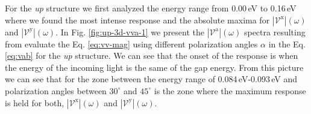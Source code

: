 \documentclass[prb,11pt,tightenlines,twocolumn,aps]{revtex4-1}
\begin{document}
For the \emph{up} structure we first analyzed the energy range from 0.00\,eV to
0.16\,eV where we found the most intense response and the absolute maxima for
$|\mathcal{V}^{\mathrm{x}}|(\omega)$ and $|\mathcal{V}^{\mathrm{y}}|(\omega)$.
% 
In Fig. \ref{fig:up-3d-vva-1} we present the
$|\mathcal{V}^{\mathrm{a}}|(\omega)$ spectra resulting from evaluate the Eq.
\eqref{eq:vv-mag} using different polarization angles $\alpha$ in the Eq.
\eqref{eq:vab} for the \emph{up} structure. We can see that the onset of the
response is when the energy of the incoming light is the same of the gap energy.
%
From this picture we can see that for the zone between the energy range of
0.084\,eV-0.093\,eV and polarization angles between $30^{\circ}$ and
$45^{\circ}$ is the zone where the maximum response is held for both,
$|\mathcal{V}^{\mathrm{x}}|(\omega)$ and $|\mathcal{V}^{\mathrm{y}}|(\omega)$.
\end{document}
